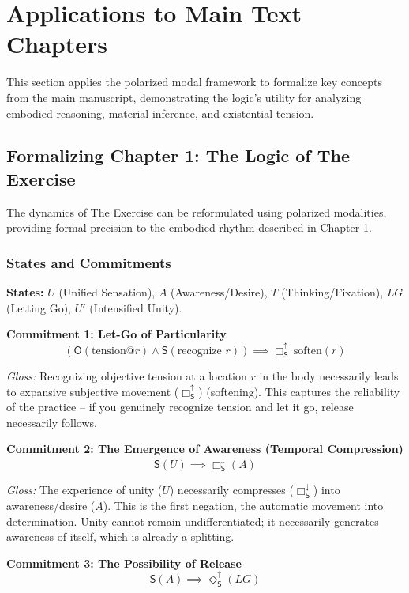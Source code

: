 \documentclass[12pt]{book}
\newcommand{\SBoxUp}{\Box_{\mathsf{S}}^{\uparrow}}
\newcommand{\SBoxDown}{\Box_{\mathsf{S}}^{\downarrow}}
\newcommand{\SDiaUp}{\Diamond_{\mathsf{S}}^{\uparrow}}
\begin{document}
\section{Applications to Main Text Chapters}

This section applies the polarized modal framework to formalize key concepts from the main manuscript, demonstrating the logic's utility for analyzing embodied reasoning, material inference, and existential tension.

\subsection{Formalizing Chapter 1: The Logic of The Exercise}

The dynamics of The Exercise can be reformulated using polarized modalities, providing formal precision to the embodied rhythm described in Chapter 1.

\subsubsection{States and Commitments}

\textbf{States:} $U$ (Unified Sensation), $A$ (Awareness/Desire), $T$ (Thinking/Fixation), $LG$ (Letting Go), $U'$ (Intensified Unity).

\bigskip

\noindent\textbf{Commitment 1: Let-Go of Particularity}
$$ (\mathsf{O}(\text{tension@}r) \wedge \mathsf{S}(\text{recognize }r)) \implies \SBoxUp\,\text{soften}(r) $$

\textit{Gloss:} Recognizing objective tension at a location $r$ in the body necessarily leads to expansive subjective movement ($\SBoxUp$) (softening). This captures the reliability of the practice -- if you genuinely recognize tension and let it go, release necessarily follows.

\bigskip

\noindent\textbf{Commitment 2: The Emergence of Awareness (Temporal Compression)}
$$ \mathsf{S}(U) \implies \SBoxDown(A) $$

\textit{Gloss:} The experience of unity ($U$) necessarily compresses ($\SBoxDown$) into awareness/desire ($A$). This is the first negation, the automatic movement into determination. Unity cannot remain undifferentiated; it necessarily generates awareness of itself, which is already a splitting.

\bigskip

\noindent\textbf{Commitment 3: The Possibility of Release}
$$ \mathsf{S}(A) \implies \SDiaUp(LG) $$
\end{document}
